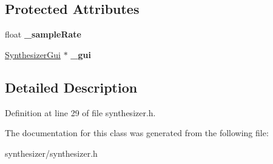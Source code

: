 \subsection*{Protected Attributes}
\begin{DoxyCompactItemize}
\item 
\mbox{\label{class_ms_1_1_synthesizer_a9c64d1dd4ba86a5a4f299f6cfd8e6ce1}} 
float {\bfseries \+\_\+sample\+Rate}
\item 
\mbox{\label{class_ms_1_1_synthesizer_af6b25c4d3a8e8469c6d66618d0291d3d}} 
\hyperlink{class_ms_1_1_synthesizer_gui}{Synthesizer\+Gui} $\ast$ {\bfseries \+\_\+gui}
\end{DoxyCompactItemize}


\subsection{Detailed Description}


Definition at line 29 of file synthesizer.\+h.



The documentation for this class was generated from the following file\+:\begin{DoxyCompactItemize}
\item 
synthesizer/synthesizer.\+h\end{DoxyCompactItemize}

